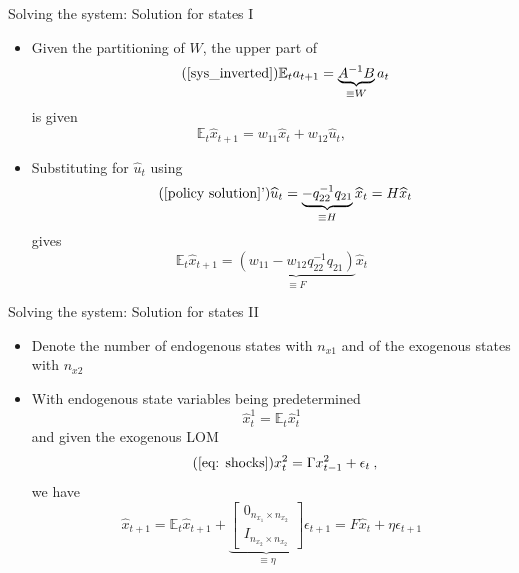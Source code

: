 \documentclass[handout,usepdftitle=false,xcolor=dvipsnames,aspectratio=169]{beamer}
\begin{document}
\begin{frame}{Solving the system: Solution for states I}
\begin{itemize}
    \item Given the partitioning of $W$, the upper part of
    \begin{equation}  \tag{\ref{sys_inverted}}
    \mathbb{E}_t a_{t+1} =\underbrace{A^{-1}B}_{\equiv W}a_t
\end{equation}
is given
    \begin{equation}
    \mathbb{E}_t \widehat{x}_{t+1}=w_{11} \widehat{x}_t+w_{12} \widehat{u}_t,
    \end{equation}
    \item Substituting for $\widehat{u}_t$ using
    \begin{equation}\tag{\ref{policy solution}'}
  \widehat{u}_t = \underbrace{-q_{22}^{-1}q_{21} }_{\equiv H} \widehat{x}_t=H\widehat{x}_t
\end{equation}
 gives
    \begin{equation}
        \mathbb{E}_t \widehat{x}_{t+1}=\underbrace{(w_{11}-w_{12}q_{22}^{-1}q_{21})}_{\equiv F} \widehat{x}_t
    \end{equation}
\end{itemize}
\end{frame}

\begin{frame}{Solving the system: Solution for states II}
\begin{itemize}
   \item Denote the number of endogenous states with $n_{x1}$ and of the exogenous states with $n_{x2}$
    \item With endogenous state variables being predetermined
    \begin{equation}
    \widehat{x}^1_{t} = \mathbb{E}_t \widehat{x}^1_{t}
    \end{equation}
    and given the exogenous LOM
    \begin{equation}\tag{\ref{eq: shocks}}
    x_{t}^2 = \Gamma x_{t-1}^2 + \epsilon_{t} \: ,
    \end{equation}
 we have
    \begin{equation}\label{actual law of motion solution}
       \widehat{x}_{t+1}=\mathbb{E}_t\widehat{x}_{t+1} + \underbrace{\left[ \begin{array}{c}
                                     0_{n_{x_1} \times n_{x_2}} \\
                                     I_{n_{x_2} \times n_{x_2}}
                                   \end{array}
     \right]}_{\equiv \eta} \epsilon_{t+1} = F \widehat{x}_t + \eta  \epsilon_{t+1}
    \end{equation}
\end{itemize}
\end{frame}
\end{document}
